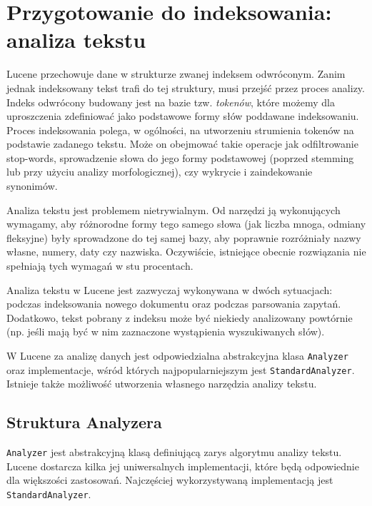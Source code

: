 \chapter{Przygotowanie do indeksowania: analiza tekstu}

Lucene przechowuje dane w strukturze zwanej indeksem odwróconym. Zanim jednak indeksowany tekst trafi do tej struktury, musi przejść przez proces analizy. Indeks odwrócony budowany jest na bazie tzw. \emph{tokenów}, które możemy dla uproszczenia zdefiniować jako podstawowe formy słów poddawane indeksowaniu. Proces indeksowania polega, w ogólności, na utworzeniu strumienia tokenów na podstawie zadanego tekstu. Może on obejmować takie operacje jak odfiltrowanie stop-words, sprowadzenie słowa do jego formy podstawowej (poprzed stemming lub przy użyciu analizy morfologicznej), czy wykrycie i zaindekowanie synonimów. 

Analiza tekstu jest problemem nietrywialnym. Od narzędzi ją wykonujących wymagamy, aby różnorodne formy tego samego słowa (jak liczba mnoga, odmiany fleksyjne) były sprowadzone do tej samej bazy, aby poprawnie rozróżniały nazwy własne, numery, daty czy nazwiska. Oczywiście, istniejące obecnie rozwiązania nie spełniają tych wymagań w stu procentach.

Analiza tekstu w Lucene jest zazwyczaj wykonywana w dwóch sytuacjach: podczas indeksowania nowego dokumentu oraz podczas parsowania zapytań. Dodatkowo, tekst pobrany z indeksu może być niekiedy analizowany powtórnie (np. jeśli mają być w nim zaznaczone wystąpienia wyszukiwanych słów).

W Lucene za analizę danych jest odpowiedzialna abstrakcyjna klasa \texttt{Analyzer} oraz implementacje, wśród których najpopularniejszym jest \texttt{StandardAnalyzer}. Istnieje także możliwość utworzenia własnego narzędzia analizy tekstu. 

\section{Struktura Analyzera}

\texttt{Analyzer} jest abstrakcyjną klasą definiującą zarys algorytmu analizy tekstu. Lucene dostarcza kilka jej uniwersalnych implementacji, które będą odpowiednie dla większości zastosowań. Najczęściej wykorzystywaną implementacją jest \texttt{StandardAnalyzer}.

